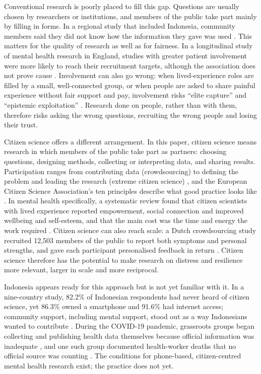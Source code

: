 \documentclass[
  number,
  preprint]{elsarticle}
\begin{document}
Conventional research is poorly placed to fill this gap. Questions are
usually chosen by researchers or institutions, and members of the public
take part mainly by filling in forms. In a regional study that included
Indonesia, community members said they did not know how the information
they gave was used \citep{kumar2025}. This matters for the quality of
research as well as for fairness. In a longitudinal study of mental
health research in England, studies with greater patient involvement
were more likely to reach their recruitment targets, although the
association does not prove cause \citep{ennis2013}. Involvement can also
go wrong: when lived-experience roles are filled by a small,
well-connected group, or when people are asked to share painful
experience without fair support and pay, involvement risks ``elite
capture'' and ``epistemic exploitation'' \citep{okoroji2023}. Research
done on people, rather than with them, therefore risks asking the wrong
questions, recruiting the wrong people and losing their trust.

Citizen science offers a different arrangement. In this paper, citizen
science means research in which members of the public take part as
partners: choosing questions, designing methods, collecting or
interpreting data, and sharing results. Participation ranges from
contributing data (crowdsourcing) to defining the problem and leading
the research (extreme citizen science) \citep{haklay2013}, and the
European Citizen Science Association's ten principles describe what good
practice looks like \citep{robinson2018}. In mental health specifically,
a systematic review found that citizen scientists with lived experience
reported empowerment, social connection and improved wellbeing and
self-esteem, and that the main cost was the time and energy the work
required \citep{todowede2023}. Citizen science can also reach scale: a
Dutch crowdsourcing study recruited 12,503 members of the public to
report both symptoms and personal strengths, and gave each participant
personalised feedback in return \citep{vanderkrieke2016}. Citizen
science therefore has the potential to make research on distress and
resilience more relevant, larger in scale and more reciprocal.

Indonesia appears ready for this approach but is not yet familiar with
it. In a nine-country study, 82.2\% of Indonesian respondents had never
heard of citizen science, yet 86.3\% owned a smartphone and 91.6\% had
internet access; community support, including mental support, stood out
as a way Indonesians wanted to contribute \citep{tan2024}. During the
COVID-19 pandemic, grassroots groups began collecting and publishing
health data themselves because official information was inadequate
\citep{nadzir2020}, and one such group documented health-worker deaths
that no official source was counting \citep{ekawati2022}. The conditions
for phone-based, citizen-centred mental health research exist; the
practice does not yet.
\end{document}
